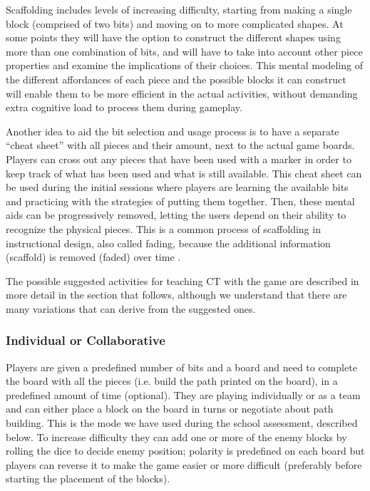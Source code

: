 \documentclass{acm_proc_article-sp}
\begin{document}
Scaffolding includes levels of increasing difficulty, starting from making a single block (comprised of two bits) and moving on to more complicated shapes. At some points they will have the option to construct the different shapes using more than one combination of bits, and will have to take into account other piece properties and examine the implications of their choices. This mental modeling of the different affordances of each piece and the possible blocks it can construct will enable them to be more efficient in the actual activities, without demanding extra cognitive load to process them during gameplay. 

Another idea to aid the bit selection and usage process is to have a separate ``cheat sheet'' with all pieces and their amount, next to the actual game boards. Players can cross out any pieces that have been used with a marker in order to keep track of what has been used and what is still available. This cheat sheet can be used during the initial sessions where players are learning the available bits and practicing with the strategies of putting them together. Then, these mental aids can be progressively removed, letting the users depend on their ability to recognize the physical pieces. This is a common process of scaffolding in instructional design, also called fading, because the additional information (scaffold) is removed (faded) over time \cite{driscoll2005psychology}.

The possible suggested activities for teaching CT with the game are described in more detail in the section that follows, although we understand that there are many variations that can derive from the suggested ones.

\subsubsection{Individual or Collaborative}
Players are given a predefined number of bits and a board and need to complete the board with all the pieces (i.e. build the path printed on the board), in a predefined amount of time (optional). They are playing individually or as a team and can either place a block on the board in turns or negotiate about path building. This is the mode we have used during the school assessment, described below. To increase difficulty they can add one or more of the enemy blocks by rolling the dice to decide enemy position; polarity is predefined on each board but players can reverse it to make the game easier or more difficult (preferably before starting the placement of the blocks).
\end{document}

